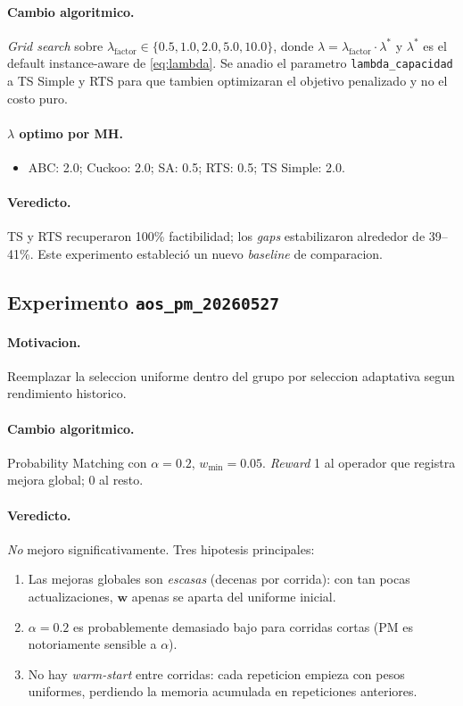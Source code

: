 \documentclass[11pt,a4paper]{article}
\newcommand{\mh}{MH}
\newcommand{\code}[1]{\texttt{#1}}
\begin{document}
\paragraph{Cambio algoritmico.} \emph{Grid search} sobre
$\lambda_{\text{factor}}\in\{0.5, 1.0, 2.0, 5.0, 10.0\}$, donde
$\lambda=\lambda_{\text{factor}}\cdot\lambda^*$ y $\lambda^*$ es el
default instance-aware de \eqref{eq:lambda}. Se anadio el parametro
\code{lambda\_capacidad} a TS Simple y RTS para que tambien optimizaran
el objetivo penalizado y no el costo puro.

\paragraph{$\lambda$ optimo por \mh.}
\begin{itemize}
\item ABC: 2.0; Cuckoo: 2.0; SA: 0.5; RTS: 0.5; TS Simple: 2.0.
\end{itemize}

\paragraph{Veredicto.} TS y RTS recuperaron 100\% factibilidad; los
\emph{gaps} estabilizaron alrededor de 39--41\%. Este experimento
estableci\'o un nuevo \emph{baseline} de comparacion.

\subsection{Experimento \texttt{aos\_pm\_20260527}}

\paragraph{Motivacion.} Reemplazar la seleccion uniforme dentro del
grupo por seleccion adaptativa segun rendimiento historico.

\paragraph{Cambio algoritmico.} Probability Matching con $\alpha=0.2$,
$w_{\min}=0.05$. \emph{Reward} 1 al operador que registra mejora
global; 0 al resto.

\paragraph{Veredicto.} \emph{No} mejoro significativamente. Tres
hipotesis principales:
\begin{enumerate}
\item Las mejoras globales son \emph{escasas} (decenas por corrida):
con tan pocas actualizaciones, $\mathbf{w}$ apenas se aparta del
uniforme inicial.
\item $\alpha=0.2$ es probablemente demasiado bajo para corridas
cortas (PM es notoriamente sensible a $\alpha$).
\item No hay \emph{warm-start} entre corridas: cada repeticion empieza
con pesos uniformes, perdiendo la memoria acumulada en repeticiones
anteriores.
\end{enumerate}
\end{document}
